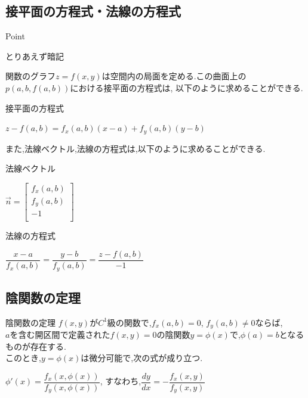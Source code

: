 \documentclass[a4paper]{jsarticle}
\begin{document}
\subsection{接平面の方程式・法線の方程式}
\begin{itembox}[l]{Point}
    \begin{center}
        とりあえず暗記
    \end{center}
\end{itembox}
関数のグラフ$z=f\left(x,y\right)$は空間内の局面を定める.この曲面上の$p(a,b,f\left(a,b\right))$における接平面の方程式は,
以下のように求めることができる.
\begin{itembox}[l]{接平面の方程式}
    \begin{center}
        $z-f\left(a,b\right)=f_x\left(a,b\right)\left(x-a\right)+f_y\left(a,b\right)\left(y-b\right)$
    \end{center}
\end{itembox}
また,法線ベクトル,法線の方程式は,以下のように求めることができる.
\begin{itembox}[l]{法線ベクトル}
    \begin{center}
        $ \vec{n}=
            \begin{bmatrix}
                f_x\left(a,b\right) \\
                f_y\left(a,b\right) \\
                -1                  \\
            \end{bmatrix}
        $
    \end{center}
\end{itembox}
\begin{itembox}[l]{法線の方程式}
    \begin{center}
        $\dfrac{x-a}{f_x\left(a,b\right)}=\dfrac{y-b}{f_y\left(a,b\right)}=\dfrac{z-f\left(a,b\right)}{-1}$
    \end{center}
\end{itembox}
\subsection{陰関数の定理}
\begin{itembox}[l]{陰関数の定理}
    $f\left(x,y\right)$が$C^1$級の関数で,$f_x\left(a,b\right)=0$, $f_y\left(a,b\right)\neq0$ならば,\\
    $a$を含む開区間で定義された$f(x,y)=0$の陰関数$y=\phi\left(x\right)$で,$\phi\left(a\right)=b$となるものが存在する.\\
    このとき,$y=\phi\left(x\right)$は微分可能で,次の式が成り立つ.
    \begin{center}
        $\phi'\left(x\right)=\dfrac{f_x\left(x,\phi\left(x\right)\right)}{f_y\left(x,\phi\left(x\right)\right)}$,
        \quad すなわち,\quad$\dfrac{dy}{dx}=-\dfrac{f_x\left(x,y\right)}{f_y\left(x,y\right)}$
    \end{center}
\end{itembox}
\end{document}
